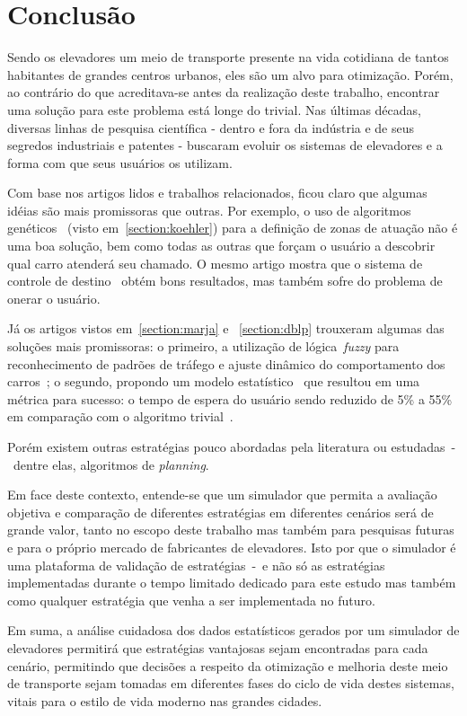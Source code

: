 \chapter{\label{chap:conclusion}Conclusão}

Sendo os elevadores um meio de transporte presente na vida cotidiana de tantos
habitantes de grandes centros urbanos, eles são um alvo para otimização. Porém,
ao contrário do que acreditava-se antes da realização deste trabalho, encontrar
uma solução para este problema está longe do trivial. Nas últimas décadas,
diversas linhas de pesquisa científica - dentro e fora da indústria e de seus
segredos industriais e patentes - buscaram evoluir os sistemas de elevadores e a
forma com que seus usuários os utilizam.

Com base nos artigos lidos e trabalhos relacionados, ficou claro que algumas
idéias são mais promissoras que outras. Por exemplo, o uso de algoritmos
genéticos~\cite{KOEHLEROTTIGER02} (visto em~\ref{section:koehler}) para a
definição de zonas de atuação não é uma boa solução, bem como todas as outras
que forçam o usuário a descobrir qual carro atenderá seu chamado. O mesmo artigo
mostra que o sistema de controle de destino~\cite{KOEHLEROTTIGER02} obtém bons
resultados, mas também sofre do problema de onerar o usuário.

Já os artigos vistos em~\ref{section:marja} e ~\ref{section:dblp} trouxeram
algumas das soluções mais promissoras: o primeiro, a utilização de
lógica~\textit{fuzzy} para reconhecimento de padrões de tráfego e ajuste
dinâmico do comportamento dos carros~\cite{marja97}; o segundo, propondo um
modelo estatístico~\cite{DBLP:journals/corr/abs-1212-2499} que resultou em uma
métrica para sucesso: o tempo de espera do usuário sendo reduzido de 5\% a 55\%
em comparação com o algoritmo trivial~\cite{DBLP:journals/corr/abs-1212-2499}.

Porém existem outras estratégias pouco abordadas pela literatura ou
estudadas~-~dentre elas, algoritmos de \textit{planning}.

Em face deste contexto, entende-se que um simulador que permita a avaliação
objetiva e comparação de diferentes estratégias em diferentes cenários será de
grande valor, tanto no escopo deste trabalho mas também para pesquisas futuras e
para o próprio mercado de fabricantes de elevadores. Isto por que o simulador é
uma plataforma de validação de estratégias~-~e não só as estratégias
implementadas durante o tempo limitado dedicado para este estudo mas também como
qualquer estratégia que venha a ser implementada no futuro.

Em suma, a análise cuidadosa dos dados estatísticos gerados por um simulador de
elevadores permitirá que estratégias vantajosas sejam encontradas para cada
cenário, permitindo que decisões a respeito da otimização e melhoria deste meio
de transporte sejam tomadas em diferentes fases do ciclo de vida destes
sistemas, vitais para o estilo de vida moderno nas grandes cidades.
